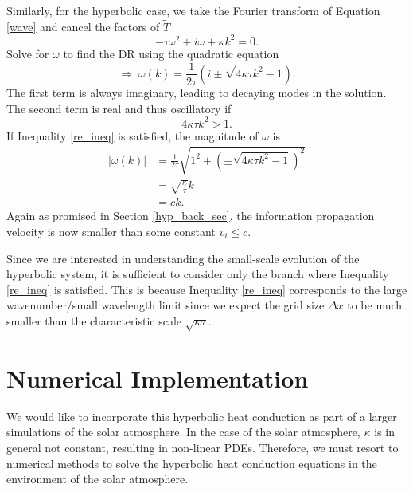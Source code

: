 \documentclass[iop]{emulateapj}
\begin{document}
			Similarly, for the hyperbolic case, we take the Fourier transform of Equation \ref{wave} and cancel the factors of $\tilde{T}$
			\begin{equation}
				- \tau \omega^2 + i \omega + \kappa k^2 = 0.
			\end{equation}
			Solve for $\omega$ to find the \ac{DR} using the quadratic equation
			\begin{equation}
				\Rightarrow \; \omega(k) = \frac{1}{2 \tau} \left( i \pm \sqrt{4 \kappa \tau k^2 - 1} \right).
			\end{equation}
			The first term is always imaginary, leading to decaying modes in the solution.
			The second term is real and thus oscillatory if 
			\begin{equation} \label{re_ineq}
			 4 \kappa \tau k^2 > 1.
			\end{equation}			
			If Inequality \ref{re_ineq} is satisfied, the magnitude of $\omega$ is
			\begin{align}
				|\omega(k)| &= \frac{1}{2 \tau} \sqrt{ 1^2 +  \left(\pm \sqrt{4 \kappa \tau k^2 - 1}\right)^2 } \\
							&= \sqrt{\frac{\kappa}{\tau}} k \\
							&= c k.
			\end{align}
			Again as promised in Section \ref{hyp_back_sec}, the information propagation velocity is now smaller than some constant $v_i \leq c$.
			
			Since we are interested in understanding the small-scale evolution of the hyperbolic system, it is sufficient to consider only the branch where Inequality \ref{re_ineq} is satisfied.
			This is because Inequality \ref{re_ineq} corresponds to the large wavenumber/small wavelength limit since we expect the grid size $\Delta x$ to be much smaller than the characteristic scale $\sqrt{\kappa \tau}$.
			
			

		
	\section{Numerical Implementation} \label{num_sec}
	
		We would like to incorporate this hyperbolic heat conduction as part of a larger simulations of the solar atmosphere.
			In the case of the solar atmosphere, $\kappa$ is in general not constant, resulting in non-linear \acp{PDE}.
			Therefore, we must resort to numerical methods to solve the hyperbolic heat conduction equations in the environment of the solar atmosphere.
	
\end{document}
